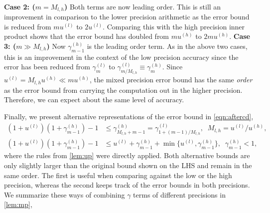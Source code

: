 \documentclass[review,onefignum,onetabnum]{siamart190516}
\begin{document}
\\
\textbf{Case 2: ($m = M_{l,h}$)}
Both terms are now leading order. 
This is still an improvement in comparison to the lower precision arithmetic as the error bound is reduced from $mu^{(l)}$ to $2u^{(l)}$.
Comparing this with the high precision inner product shows that the error bound has doubled from $mu^{(h)}$ to $2mu^{(h)}$.
\textbf{Case 3: ($m \gg M_{l,h}$)}
Now $\gamma_{m-1}^{(h)}$ is the leading order term. 
As in the above two cases, this is an improvement in the context of the low precision accuracy since the error has been reduced from $\gamma_m^{(l)}$ to $\gamma_{m/M_{l,h}}^{(l)}\equiv \gamma_m^{(h)}$. 
Since $u^{(l)} = M_{l,h}u^{(h)} \ll mu^{(h)}$, the mixed precision error bound has the same \emph{order} as the error bound from carrying the computation out in the higher precision. 
Therefore, we can expect about the same level of accuracy.\par
Finally, we present alternative representations of the error bound in \cref{eqn:aftercd},
\begin{align*}
(1+u^{(l)})(1+\gamma_{m-1}^{(h)})-1 &\leq \gamma_{M_{l,h}+m-1}^{(h)}=\gamma_{1+(m-1)/M_{l,h}}^{(l)}, \;\; M_{l,h} = u^{(l)}/u^{(h)},\\
(1+u^{(l)})(1+\gamma_{m-1}^{(h)})-1 &\leq  u^{(l)} + \gamma_{m-1}^{(h)} + \min\{u^{(l)}, \gamma_{m-1}^{(h)}\},\;\; \gamma_{m-1}^{(h)} < 1,
\end{align*}
where the rules from \cref{lem:up} were directly applied.
Both alternative bounds are only slightly larger than the original bound shown on the LHS and remain in the same order.
The first is useful when comparing against the low or the high precision, whereas the second keeps track of the error bounds in both precisions.
We summarize these ways of combining $\gamma$ terms of different precisions in \cref{lem:mp},
\end{document}
